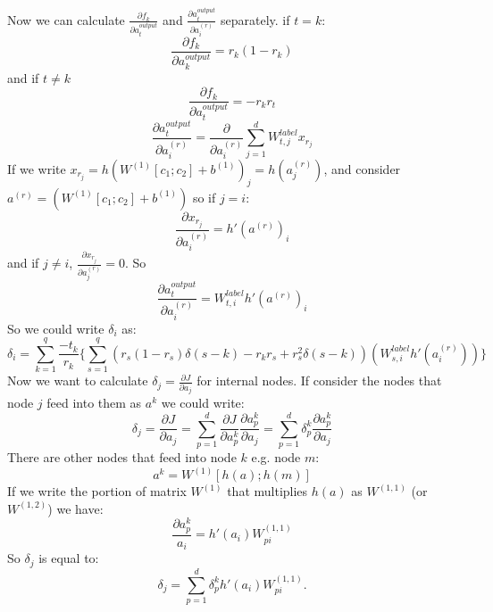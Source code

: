 \documentclass[twoside,12pt]{article}
\begin{document}
Now we can calculate $\frac{\partial f_k}{\partial a^{output}_{t}}$ and $\frac{\partial a^{output}_t}{\partial a^{(r)}_i}$ separately. if $t=k$:
\begin{equation}
\frac{\partial f_k}{\partial a^{output}_{k}}=r_k(1-r_k)
\end{equation}
and if $t\neq k$
\begin{equation}
\frac{\partial f_k}{\partial a^{output}_{t}}=-r_kr_t
\end{equation}
\begin{equation}
\frac{\partial a^{output}_t}{\partial a^{(r)}_i}=\frac{\partial}{\partial a^{(r)}_i}\sum_{j=1}^{d}W^{label}_{t,j}x_{r_j}
\end{equation}
If we write $x_{r_j}=h(W^{(1)}[c_1;c_2]+b^{(1)})_j=h(a^{(r)}_j)$, and consider $a^{(r)}=(W^{(1)}[c_1;c_2]+b^{(1)})$ so if $j=i$:
\begin{equation}
\frac{\partial x_{r_j}}{\partial a^{(r)}_i}= h'(a^{(r)})_i
\end{equation}
and if $j\neq i$, $\frac{\partial x_{r_j}}{\partial a^{(r)}_j}=0$. So 
\begin{equation}
 \frac{\partial a^{output}_t}{\partial a^{(r)}_i}=W^{label}_{t,i}h'(a^{(r)})_i
\end{equation}
So we could write $\delta_i$ as:
\begin{equation}
\delta_i=\sum_{k=1}^q \frac{-t_k}{r_k}\{\sum_{s=1}^q (r_s(1-r_s) \delta(s-k)-r_kr_s + r_s^2 \delta(s-k))(W^{label}_{s,i}h'(a^{(r)}_i))\}
\end{equation}
Now we want to calculate $\delta_j=\frac{\partial J}{\partial a_j}$ for internal nodes. If consider the nodes that node $j$ feed into them as $a^k$ we could write:
\begin{equation}
\delta_j=\frac{\partial J}{\partial a_j}=\sum_{p=1}^d \frac{\partial J}{\partial a^k_p}\frac{\partial a^k_p}{\partial a_j}=\sum_{p=1}^d \delta^{k}_p \frac{\partial a^k_p}{\partial a_j}
\end{equation}
There are other nodes that feed into node $k$ e.g. node $m$:
\begin{equation}
a^k=W^{(1)}[h(a);h(m)]
\end{equation}
If we write the portion of matrix $W^{(1)}$ that multiplies $h(a)$ as $W^{(1,1)}$ (or $W^{(1,2)}$) we have:
\begin{equation}
\frac{\partial a^k_p}{a_i}=h'(a_i)W^{(1,1)}_{pi}
\end{equation}
So $\delta_j$ is equal to:
\begin{equation}
\delta_j = \sum_{p=1}^d \delta_p^kh'(a_i)W^{(1,1)}_{pi}.
\label{eq:delta vector}
\end{equation}
\end{document}
